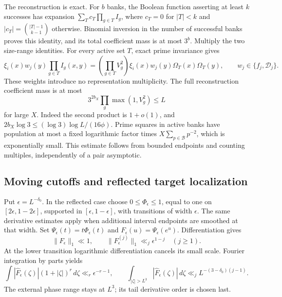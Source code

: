 The reconstruction is exact. For \(b\) banks, the Boolean function
asserting at least \(k\) successes has expansion
\(\sum_Tc_T\prod_{g\in T}I_g\), where \(c_T=0\) for \(|T|<k\)
and \(|c_T|=\binom{|T|-1}{k-1}\) otherwise. Binomial inversion in
the number of successful banks proves this identity, and its total
coefficient mass is at most \(3^b\). Multiply the two size-range
identities. For every active set \(T\), exact prime invariance gives
\begin{equation}\label{eq:reconstruction}
 \xi_i(x)w_j(y)\prod_{g\in T}I_g(x,y)
 =\left(\prod_{g\in T}V_g^2\right)
                  \xi_i(x)w_j(y)\Omega_T(x)\Omega_T(y),
 \qquad w_j\in\{f_j,\mathcal D_j\}.
\end{equation}
These weights introduce no representation multiplicity.
The full reconstruction coefficient mass is at most
\[
 3^{2b_X}\prod_g\max(1,V_g^2)\le L
\]
for large \(X\). Indeed the second product is \(1+o(1)\), and
\(2b_X\log3\le(\log3)\log L/(16\phi)\).
Prime squares in active banks have population at most a fixed
logarithmic factor times \(X\sum_{p\in\mathcal B}p^{-2}\),
which is exponentially small. This estimate follows from bounded
endpoints and counting multiples, independently of a pair asymptotic.

\subsection{Moving cutoffs and reflected target localization}
Put \(\epsilon=L^{-\delta_0}\). In the reflected case choose
\(0\le\Phi_\epsilon\le1\), equal to one on
\([2\epsilon,1-2\epsilon]\), supported in
\([\epsilon,1-\epsilon]\), with transitions of width \(\epsilon\).
The same derivative estimates apply when additional interval endpoints
are smoothed at that width. Set
\(\Psi_\epsilon(t)=t\Phi_\epsilon(t)\) and
\(F_\epsilon(u)=\Psi_\epsilon(e^u)\). Differentiation gives
\[
 \|F_\epsilon\|_1\ll1,\qquad
 \|F_\epsilon^{(j)}\|_1\ll_j\epsilon^{1-j}\quad(j\ge1).
\]
At the lower transition logarithmic differentiation cancels its small
scale. Fourier integration by parts yields
\begin{equation}\label{eq:mellin-budget}
 \int|\widehat F_\epsilon(\zeta)|(1+|\zeta|)^r\,d\zeta
 \ll_r\epsilon^{-r-1},\qquad
 \int_{|\zeta|>L^3}|\widehat F_\epsilon(\zeta)|\,d\zeta
 \ll_j L^{-(3-\delta_0)(j-1)}.
\end{equation}
The external phase range stays at \(L^3\); its tail derivative order
is chosen last.

